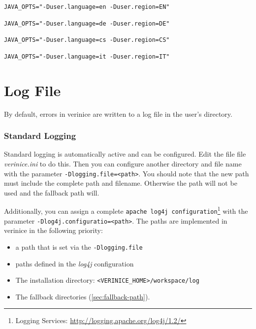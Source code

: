 \documentclass[a4paper,10pt]{book}
\begin{document}
\begin{lstlisting}[language=Plain, caption={tomcat.conf English}]
JAVA_OPTS="-Duser.language=en -Duser.region=EN"
\end{lstlisting}

\begin{lstlisting}[language=Plain, caption={tomcat.conf German}]
JAVA_OPTS="-Duser.language=de -Duser.region=DE"
\end{lstlisting}

\begin{lstlisting}[language=Plain, caption={tomcat.conf Czech}]
JAVA_OPTS="-Duser.language=cs -Duser.region=CS"
\end{lstlisting}

\begin{lstlisting}[language=Plain, caption={tomcat.conf Italian}]
JAVA_OPTS="-Duser.language=it -Duser.region=IT"
\end{lstlisting}

\section{Log File}
\label{sec:log-file}

By default, errors in verinice are written to a log file in the user’s
directory.

\subsubsection{Standard Logging}
\label{sec:standard-logging}

Standard logging is automatically active and can be configured. Edit
the file file \textit{verinice.ini} to do this. Then you can configure
another directory and file name with the parameter
\texttt{-Dlogging.file=<path>}. You should note that the new path must
include the complete path and filename. Otherwise the path will not be
used and the fallback path will.

Additionally, you can assign a complete \texttt{apache log4j
  configuration}\footnote{Logging Services:
  \url{http://logging.apache.org/log4j/1.2/}} with the parameter
\texttt{-Dlog4j.configuratio=<path>}. The paths are implemented in
verinice in the following priority:

\begin{itemize}
\item a path that is set via the \texttt{-Dlogging.file}
\item paths defined in the \textit{log4j} configuration
\item The installation directory:
  \texttt{<VERINICE\_HOME>/workspace/log}
\item The fallback directories (\ref{sec:fallback-path}).
\end{itemize}
\end{document}
